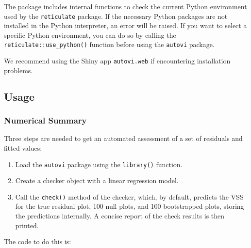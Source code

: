\documentclass[
doublespace,
  times]{anzsauth}
\newenvironment{Shaded}{\begin{snugshade}}{\end{snugshade}}
\newcommand{\AttributeTok}[1]{\textcolor[rgb]{0.40,0.45,0.13}{#1}}
\newcommand{\FunctionTok}[1]{\textcolor[rgb]{0.28,0.35,0.67}{#1}}
\newcommand{\NormalTok}[1]{\textcolor[rgb]{0.00,0.23,0.31}{#1}}
\newcommand{\OtherTok}[1]{\textcolor[rgb]{0.00,0.23,0.31}{#1}}
\newcommand{\SpecialCharTok}[1]{\textcolor[rgb]{0.37,0.37,0.37}{#1}}
\providecommand{\tightlist}{%
  \setlength{\itemsep}{0pt}\setlength{\parskip}{0pt}}\usepackage{longtable,booktabs,array}
\begin{document}
The package includes internal functions to check the current Python
environment used by the \texttt{reticulate} package. If the necessary
Python packages are not installed in the Python interpreter, an error
will be raised. If you want to select a specific Python environment, you
can do so by calling the \texttt{reticulate::use\_python()} function
before using the \texttt{autovi} package.

We recommend using the Shiny app \texttt{autovi.web} if encountering
installation problems.

\subsection{Usage}\label{sec-autovi-usage}

\subsubsection{Numerical Summary}\label{sec-autovi-numerical}

Three steps are needed to get an automated assessment of a set of
residuals and fitted values:

\begin{enumerate}
\def\labelenumi{\arabic{enumi}.}
\tightlist
\item
  Load the \texttt{autovi} package using the \texttt{library()}
  function.
\item
  Create a checker object with a linear regression model.
\item
  Call the \texttt{check()} method of the checker, which, by default,
  predicts the VSS for the true residual plot, 100 null plots, and 100
  bootstrapped plots, storing the predictions internally. A concise
  report of the check results is then printed.
\end{enumerate}

The code to do this is:

\begin{Shaded}
\end{Shaded}
\end{document}
